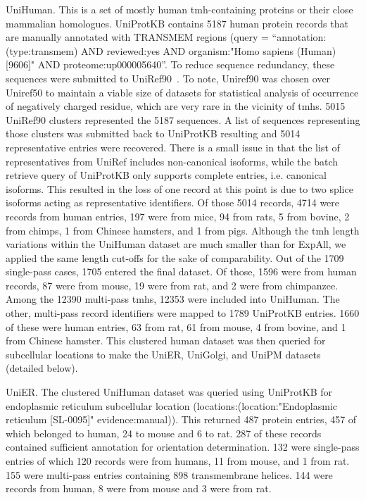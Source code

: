 UniHuman. This is a set of mostly human \gls{tmh}-containing proteins or their close mammalian homologues. UniProtKB contains 5187 human protein records that are manually annotated with TRANSMEM regions (query = “annotation:(type:transmem) AND reviewed:yes AND organism:"Homo sapiens (Human) [9606]" AND proteome:up000005640”. To reduce sequence redundancy, these sequences were submitted to UniRef90~\cite{Suzek2015}. To note, Uniref90 was chosen over Uniref50 to maintain a viable size of datasets for statistical analysis of occurrence of negatively charged residue, which are very rare in the vicinity of \gls{tmh}s. 5015 UniRef90 clusters represented the 5187 sequences. A list of sequences representing those clusters was submitted back to UniProtKB resulting and 5014 representative entries were recovered. There is a small issue in that the list of representatives from UniRef includes non-canonical isoforms, while the batch retrieve query of UniProtKB only supports complete entries, i.e. canonical isoforms. This resulted in the loss of one record at this point is due to two splice isoforms acting as representative identifiers. Of those 5014 records, 4714 were records from human entries, 197 were from mice, 94 from rats, 5 from bovine, 2 from chimps, 1 from Chinese hamsters, and 1 from pigs. Although the \gls{tmh} length variations within the UniHuman dataset are much smaller than for ExpAll, we applied the same length cut-offs for the sake of comparability. Out of the 1709 single-pass cases, 1705 entered the final dataset. Of those, 1596 were from human records, 87 were from mouse, 19 were from rat, and 2 were from chimpanzee. Among the 12390 multi-pass \gls{tmh}s, 12353 were included into UniHuman. The other, multi-pass record identifiers were mapped to 1789 UniProtKB entries. 1660 of these were human entries, 63 from rat, 61 from mouse, 4 from bovine, and 1 from Chinese hamster. This clustered human dataset was then queried for subcellular locations to make the UniER, UniGolgi, and UniPM datasets (detailed below).

UniER. The clustered UniHuman dataset was queried using UniProtKB for endoplasmic reticulum subcellular location (locations:(location:"Endoplasmic reticulum [SL-0095]" evidence:manual)). This returned 487 protein entries, 457 of which belonged to human, 24 to mouse and 6 to rat. 287 of these records contained sufficient annotation for orientation determination. 132 were single-pass entries of which 120 records were from humans, 11 from mouse, and 1 from rat. 155 were multi-pass entries containing 898 transmembrane helices. 144 were records from human, 8 were from mouse and 3 were from rat.

